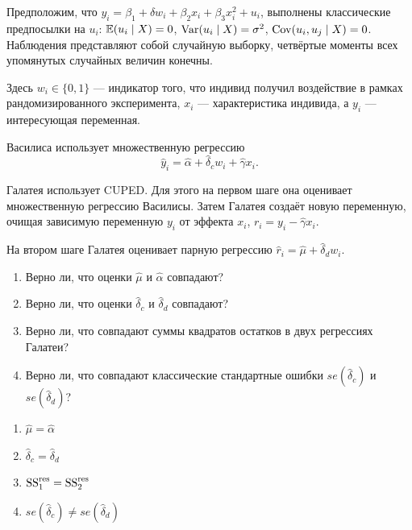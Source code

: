 \begin{problem}
Предположим, что $y_i = \beta_1 + \delta w_i + \beta_2 x_i + \beta_3 x_i^2 + u_i$,
 выполнены классические предпосылки на $u_i$: $\operatorname{\mathbb{E}}(u_i \mid X) = 0$,
 $\operatorname{Var}(u_i \mid X) = \sigma^2$, $\operatorname{Cov}(u_i, u_j \mid X) = 0$.
 Наблюдения представляют собой случайную выборку, четвёртые моменты 
 всех упомянутых случайных величин конечны. 

 Здесь $w_i \in \{0, 1\}$ — индикатор того, что индивид получил воздействие 
 в рамках рандомизированного эксперимента, $x_i$ — характеристика индивида,
а $y_i$ — интересующая переменная. 
  
Василиса использует множественную регрессию 
\[
  \hat y_i = \hat \alpha + \hat \delta_c w_i + \hat \gamma x_i.
\]

Галатея использует CUPED. Для этого на первом шаге она оценивает 
множественную регрессию Василисы.
Затем Галатея создаёт новую переменную, очищая зависимую переменную $y_i$ 
от эффекта $x_i$, $r_i =  y_i - \hat \gamma x_i$.

На втором шаге Галатея оценивает парную регрессию $\hat r_i = \hat \mu + \hat \delta_d w_i$.

\begin{enumerate}
  \item Верно ли, что оценки $\hat \mu$ и $\hat \alpha$ совпадают?
  \item Верно ли, что оценки $\hat \delta_c$ и $\hat \delta_d$ совпадают?
  \item Верно ли, что совпадают суммы квадратов остатков в двух регрессиях Галатеи?
  \item Верно ли, что совпадают классические стандартные ошибки $se(\hat\delta_c)$
  и $se(\hat\delta_d)$?
\end{enumerate}

  \begin{sol}
  \begin{enumerate}
\item $\hat \mu = \hat \alpha$
\item $\hat \delta_c = \hat \delta_d$ 
\item $\mathrm{SS}^{\text{res}}_1 = \mathrm{SS}^{\text{res}}_2$
\item $se(\hat\delta_c) \neq se(\hat\delta_d)$
\end{enumerate}
  
  \end{sol}
  
\end{problem}





